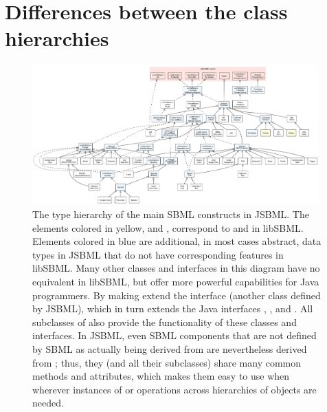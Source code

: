 

\section{Differences between the class hierarchies}
\label{sec:extended-type-hierarchy}

\begin{figure}
  \centering
  \includegraphics[width=0.98\textwidth]{../common/img/FullTypeHierarchy.pdf}
  \caption[The type hierarchy of the main SBML constructs in JSBML]{The
    type hierarchy of the main SBML constructs in JSBML. The elements
    colored in yellow,  and , correspond to
     and  in libSBML. Elements
    colored in blue are additional, in most cases abstract, data types in
    JSBML that do not have corresponding features in libSBML. Many other
    classes and interfaces in this diagram have no equivalent in libSBML,
    but offer more powerful capabilities for Java programmers. By making
    \SBase extend the interface \TreeNodeWithChangeSupport (another class
    defined by JSBML), which in turn extends the Java interfaces
    , , and \TreeNode.  All subclasses
    of  also provide the functionality of these classes and
    interfaces.  In JSBML, even SBML components that are not defined by
    SBML as actually being derived from  are nevertheless
    derived from \TreeNodeWithChangeSupport; thus, they (and all their
    subclasses) share many common methods and attributes, which makes them
    easy to use when wherever instances of \TreeNode or operations across
    hierarchies of objects are needed.}
  \label{fig:TypeHierarchy}
\end{figure}

